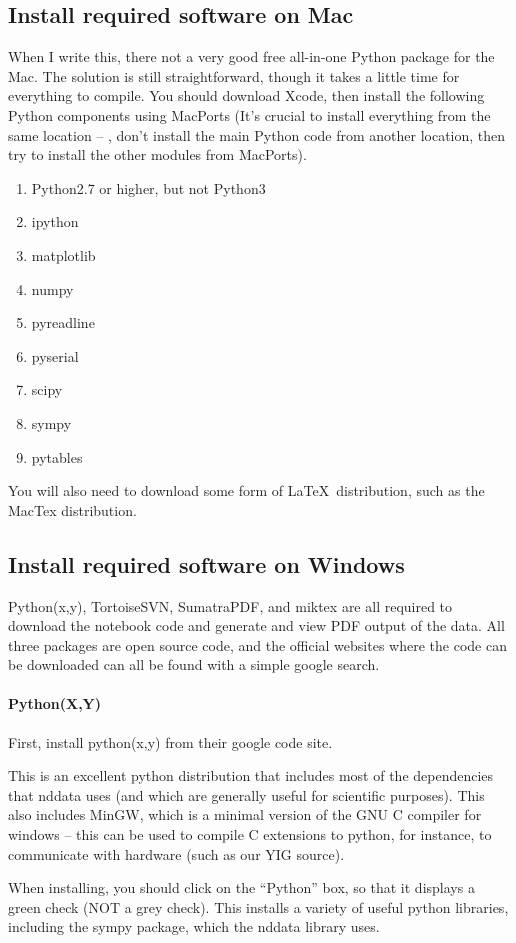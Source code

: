\subsection{Install required software on Mac}
When I write this, there not a very good free all-in-one Python package for the Mac.
The solution is still straightforward, though it takes a little time for everything to compile.
You should download Xcode, then install the following Python components using MacPorts (It's crucial to install everything from the same location -- \ie, don't install the main Python code from another location, then try to install the other modules from MacPorts). 
\begin{small}
\begin{multicols}{3}
\begin{enumerate}
    \item Python2.7 or higher, but not Python3
    \item ipython
    \item matplotlib
    \item numpy
    \item pyreadline
    \item pyserial
    \item scipy
    \item sympy
    \item pytables
\end{enumerate}
\end{multicols}
\end{small}
You will also need to download some form of \LaTeX\ distribution, such as the MacTex distribution.
\subsection{Install required software on Windows}
Python(x,y), TortoiseSVN, SumatraPDF, and miktex are all required
    to download the notebook code and generate and view PDF output
    of the data.
All three packages are open source code,
    and
    the official websites where the code can be downloaded can all be found
    with a simple google search.
\paragraph{Python(X,Y)}
First, install python(x,y) from their google code site.
\begin{inplacenotebox}
    This is an excellent python distribution that includes most of
    the dependencies that nddata uses (and which are generally useful for scientific purposes).
    This also includes MinGW, which is a minimal version of the
    GNU C compiler for windows -- this can be used to compile
    C extensions to python, for instance, to communicate with hardware
    (such as our YIG source).
\end{inplacenotebox}
When installing, you should click on the ``Python'' box,
    so that it displays a green check (NOT a grey check).
This installs a variety of useful python libraries,
    including the sympy package, which the nddata library uses.

